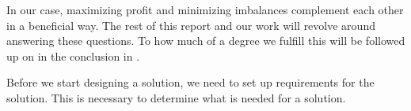 In our case, maximizing profit and minimizing imbalances complement each other in a beneficial way. The rest of this report and our work will revolve around answering these questions. To how much of a degree we fulfill this will be followed up on in the conclusion in .

Before we start designing a solution, we need to set up requirements for the solution. This is necessary to determine what is needed for a solution. 
